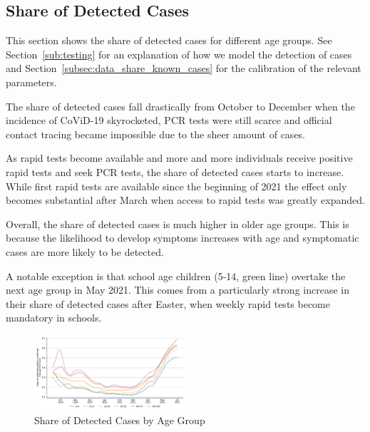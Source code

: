 \subsection{Share of Detected Cases}
\label{subsec:results_share_known_cases}


This section shows the share of detected cases for different age groups. See
Section~\ref{sub:testing} for an explanation of how we model the detection of cases
and Section~\ref{subsec:data_share_known_cases} for the calibration of the relevant
parameters.

The share of detected cases fall drastically from October to December when the
incidence of CoViD-19 skyrocketed, PCR tests were still scarce and official contact
tracing became impossible due to the sheer amount of cases.

As rapid tests become available and more and more individuals receive positive rapid
tests and seek PCR tests, the share of detected cases starts to increase. While first
rapid tests are available since the beginning of 2021 the effect only becomes substantial
after March when access to rapid tests was greatly expanded.

Overall, the share of detected cases is much higher in older age groups. This is because
the likelihood to develop symptoms increases with age and symptomatic cases are
more likely to be detected.


A notable exception is that school age children (5-14, green line) overtake the next age
group in May 2021. This comes from a particularly strong increase in their share of
detected cases after Easter, when weekly rapid tests become mandatory in schools.

\begin{figure}[ht]
  \centering
  \includegraphics[width=0.5\textwidth]{figures/results/figures/share_known_cases/full_combined_baseline_by_age_group_rki}
  \caption{Share of Detected Cases by Age Group}
  \label{fig:share_known_cases_by_age_group}
\end{figure}


\FloatBarrier
